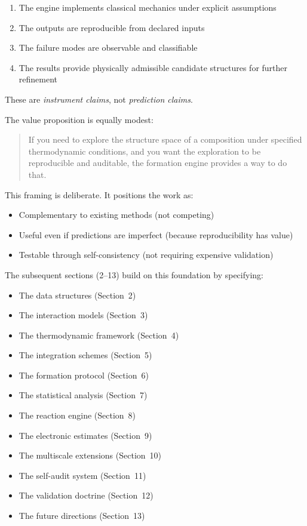 \documentclass[11pt]{article}
\begin{document}
\begin{enumerate}
\item The engine implements classical mechanics under explicit assumptions
\item The outputs are reproducible from declared inputs
\item The failure modes are observable and classifiable
\item The results provide physically admissible candidate structures for further refinement
\end{enumerate}

These are \textit{instrument claims}, not \textit{prediction claims}.

The value proposition is equally modest:

\begin{quote}
If you need to explore the structure space of a composition under specified thermodynamic conditions, and you want the exploration to be reproducible and auditable, the formation engine provides a way to do that.
\end{quote}

This framing is deliberate. It positions the work as:

\begin{itemize}
\item Complementary to existing methods (not competing)
\item Useful even if predictions are imperfect (because reproducibility has value)
\item Testable through self-consistency (not requiring expensive validation)
\end{itemize}

The subsequent sections (2–13) build on this foundation by specifying:

\begin{itemize}
\item The data structures (Section~2)
\item The interaction models (Section~3)
\item The thermodynamic framework (Section~4)
\item The integration schemes (Section~5)
\item The formation protocol (Section~6)
\item The statistical analysis (Section~7)
\item The reaction engine (Section~8)
\item The electronic estimates (Section~9)
\item The multiscale extensions (Section~10)
\item The self-audit system (Section~11)
\item The validation doctrine (Section~12)
\item The future directions (Section~13)
\end{itemize}
\end{document}
